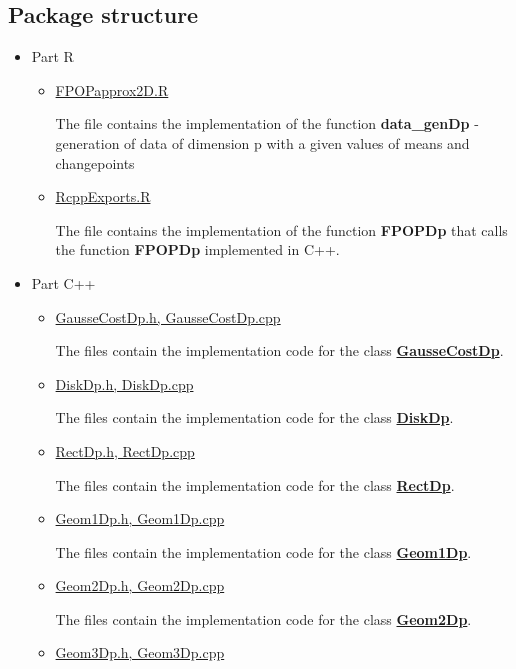 \documentclass{report}
\begin{document}
	\subsection*{Package structure}
	\begin{itemize}
		\item  Part R
		\begin{itemize}
			\item \underline {FPOPapprox2D.R}
			
			The file contains the implementation of the  function {\bfseries data\_genDp} - generation of data of dimension p with a given values of means and changepoints
			 
			\item \underline {RcppExports.R} 
			
			The file contains the implementation of the function {\bfseries FPOPDp} that calls the function {\bfseries FPOPDp} implemented in C++.
			
		\end{itemize}
		\item Part C++
		\begin{itemize}
			\item \underline {GausseCostDp.h, GausseCostDp.cpp} 
			
			The files contain the implementation code for the class \hyperref [GausseCostDp]{\bfseries GausseCostDp}. 	
			
			\item \underline{DiskDp.h, DiskDp.cpp}
			
			The files contain the implementation code for the class \hyperref [DiskDp]{\bfseries DiskDp}. 
			
			\item  \underline{RectDp.h, RectDp.cpp}
			
			The files contain the implementation code for the class \hyperref [RectDp] {\bfseries RectDp}.
			 
			\item \underline{Geom1Dp.h, Geom1Dp.cpp} 
			
			The files contain the implementation code for the class \hyperref [Geom1Dp]{\bfseries Geom1Dp}. 
			
			\item \underline{Geom2Dp.h, Geom2Dp.cpp} 
			
			The files contain the implementation code for the class \hyperref [Geom2Dp]{\bfseries Geom2Dp}. 
			
			\item \underline{Geom3Dp.h, Geom3Dp.cpp} 
			

\end{itemize}
\end{itemize}
\end{document}
